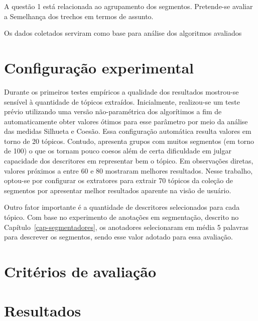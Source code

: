 A questão 1 está relacionada ao agrupamento dos segmentos. Pretende-se avaliar a Semelhança dos trechos em termos de assunto. 




Os dados coletados serviram como base para análise dos algoritmos avaliados 


\section{Configuração experimental}

Durante os primeiros testes empíricos a qualidade dos resultados mostrou-se sensível à quantidade de tópicos extraídos.
Inicialmente, realizou-se um teste prévio utilizando uma versão não-paramétrica dos algorítimos a fim de automaticamente obter valores ótimos para esse parâmetro por meio da análise das medidas Silhueta e Coesão. Essa configuração automática resulta valores em torno de 20 tópicos. Contudo, apresenta grupos com muitos segmentos (em torno de 100) o que os tornam pouco coesos além de certa dificuldade em julgar capacidade dos descritores em representar bem o tópico.  
Em observações diretas, valores próximos a entre 60 e 80 mostraram melhores resultados. Nesse trabalho, optou-se por configurar os extratores para extrair 70 tópicos da coleção de segmentos por apresentar melhor resultados aparente na visão de usuário.

Outro fator importante é a quantidade de descritores selecionados para cada tópico. Com base no experimento de anotações em segmentação, descrito no Capítulo~\ref{cap-segmentadores}, os anotadores selecionaram em média 5 palavras para descrever os segmentos, sendo esse valor adotado para essa avaliação.






\section{Critérios de avaliação}


\section{Resultados}


